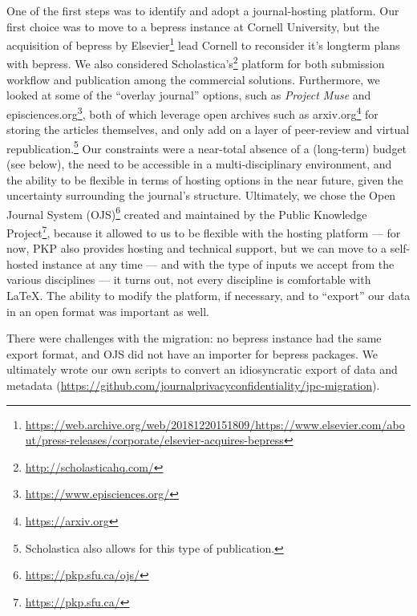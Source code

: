 \documentclass{jpcfinal} %
\newcommand{\urlcite}[2]{#2\footnote{\url{#1}}}
\newcommand{\urlcitex}[3]{#2\footnote{\href{#1}{#3}}}
\begin{document}
One of the first steps was to identify and adopt a journal-hosting platform. Our first choice was to move to a bepress instance at Cornell University, but the \urlcitex{https://web.archive.org/web/20181220151809/https://www.elsevier.com/about/press-releases/corporate/elsevier-acquires-bepress,-a-leading-service-provider-used-by-academic-institutions-to-showcase-their-research}{acquisition of bepress by Elsevier}{https://web.archive.org/web/20181220151809/https://www.elsevier.com/about/press-releases/corporate/elsevier-acquires-bepress\textellipsis} lead Cornell to reconsider it's longterm plans with bepress. We also considered  \urlcite{http://scholasticahq.com/}{Scholastica’s}  platform for both submission workflow and publication among the commercial solutions. Furthermore, we looked at some of the ``overlay journal'' options, such as \textit{Project Muse} and \urlcite{https://www.episciences.org/}{episciences.org}, both of which leverage open archives such as \urlcite{https://arxiv.org}{arxiv.org} for storing the articles themselves, and only add on a layer of peer-review and virtual republication.\footnote{Scholastica also allows for this type of publication.} Our constraints were a near-total absence of a (long-term) budget (see below),  the need to be accessible in a multi-disciplinary environment, and the ability to be flexible in terms of hosting options in the near future, given the uncertainty surrounding the journal's structure. Ultimately, we chose the \urlcite{https://pkp.sfu.ca/ojs/}{Open Journal System (OJS)}  created and maintained by the \urlcite{https://pkp.sfu.ca/}{Public Knowledge Project}, because it allowed to us to be flexible with the hosting platform --- for now, PKP also provides hosting and technical support, but we can move to a self-hosted instance at any time --- and with the type of inputs we accept from the various disciplines --- it turns out, not every discipline is comfortable with \LaTeX. The ability to modify the platform, if necessary, and to ``export'' our data in an open format was important as well.

There were challenges with the migration: no bepress instance had the same export format, and OJS did not have an importer for bepress packages. We ultimately wrote our own scripts to convert an idiosyncratic export of data and metadata (\url{https://github.com/journalprivacyconfidentiality/jpc-migration}). 
\end{document}
